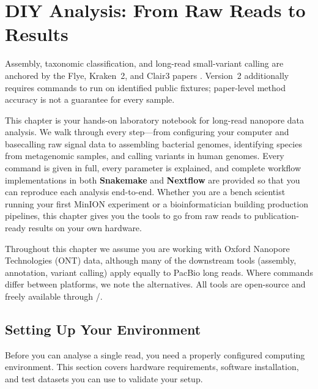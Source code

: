 \chapter{DIY Analysis: From Raw Reads to Results}
\label{ch:diyanalysis}

\begin{sourcebox}
Assembly, taxonomic classification, and long-read small-variant calling are anchored by the Flye, Kraken~2, and Clair3 papers \cite{kolmogorov2019,wood2019,zheng2022}. Version~2 additionally requires commands to run on identified public fixtures; paper-level method accuracy is not a guarantee for every sample.
\end{sourcebox}

\begin{keyconcept}
This chapter is your hands-on laboratory notebook for long-read nanopore data analysis. We walk through every step---from configuring your computer and basecalling raw signal data to assembling bacterial genomes, identifying species from metagenomic samples, and calling variants in human genomes. Every command is given in full, every parameter is explained, and complete workflow implementations in both \textbf{Snakemake} and \textbf{Nextflow} are provided so that you can reproduce each analysis end-to-end. Whether you are a bench scientist running your first MinION experiment or a bioinformatician building production pipelines, this chapter gives you the tools to go from raw reads to publication-ready results on your own hardware.
\end{keyconcept}

Throughout this chapter we assume you are working with Oxford Nanopore Technologies (\acrshort{ONT}) data, although many of the downstream tools (assembly, annotation, variant calling) apply equally to PacBio long reads. Where commands differ between platforms, we note the alternatives. All tools are open-source and freely available through /.

\section{Setting Up Your Environment}
\label{sec:diyanalysis:setup}

Before you can analyse a single read, you need a properly configured computing environment. This section covers hardware requirements, software installation, and test datasets you can use to validate your setup.

